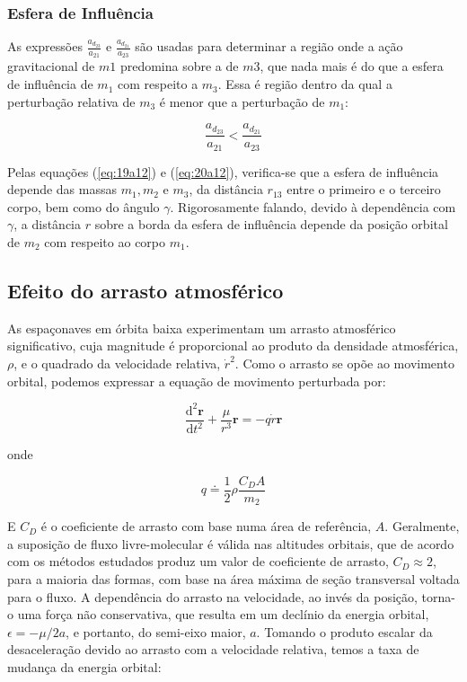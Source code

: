 \subsubsection{Esfera de Influência} 
\par As expressões $\frac{a_{d_{23}}}{a_{21}}$ e $\frac{a_{d_{21}}}{a_{23}}$ são usadas para determinar a
região onde a ação gravitacional de $m1$ predomina sobre a de $m3$, que nada mais é do que a esfera de influência de $m_1$ com respeito a $m_3$. Essa é região dentro da qual a perturbação relativa de $m_3$ é menor que a perturbação de $m_1$:

\begin{equation}
\frac{a_{d_{23}}}{a_{21}}<\frac{a_{d_{21}}}{a_{23}}
\label{eq:23a12}
\end{equation}

\par Pelas equações (\ref{eq:19a12}) e (\ref{eq:20a12}), verifica-se que a esfera de influência depende das massas $m_1, m_2$ e $m_3$, da distância $r_{13}$ entre o primeiro e o terceiro corpo, bem como do ângulo $\gamma$. Rigorosamente falando, devido à dependência com $\gamma$, a distância $r$ sobre a borda da esfera de influência depende da posição orbital de $m_2$ com respeito ao corpo $m_1$.

\subsection{Efeito do arrasto atmosférico}
\par As espaçonaves em órbita baixa experimentam um arrasto atmosférico significativo, cuja magnitude é proporcional ao produto da densidade atmosférica, $\rho$, e o quadrado da velocidade relativa, $\dot{r}^2$. Como o arrasto se opõe ao movimento orbital, podemos expressar a equação de movimento perturbada por: 

\begin{equation}
\frac{\mathrm{d}^2 \mathbf{r}}{\mathrm{d} t^2}+\frac{\mu}{r^3} \mathbf{r}=-q \dot{r} \mathbf{r}
\label{eq:1aula12}
\end{equation}

onde 

\begin{equation}
q \doteq \frac{1}{2} \rho \frac{C_D A}{m_2}
\label{eq:2aula12}
\end{equation}

E $C_D$ é o coeficiente de arrasto com base numa área de referência, $A$. Geralmente, a suposição de fluxo livre-molecular é válida nas altitudes orbitais, que de acordo com os métodos estudados produz um valor de coeficiente de arrasto, $C_D \approx 2$, para a maioria das formas, com base na área máxima de seção transversal voltada para o fluxo. A dependência do arrasto na velocidade, ao invés da posição, torna-o uma força não conservativa, que resulta em um declínio da energia orbital, $\epsilon = - \mu / 2a$, e portanto, do semi-eixo maior, $a$. Tomando o produto escalar da desaceleração devido ao arrasto com a velocidade relativa, temos a taxa de mudança da energia orbital:


